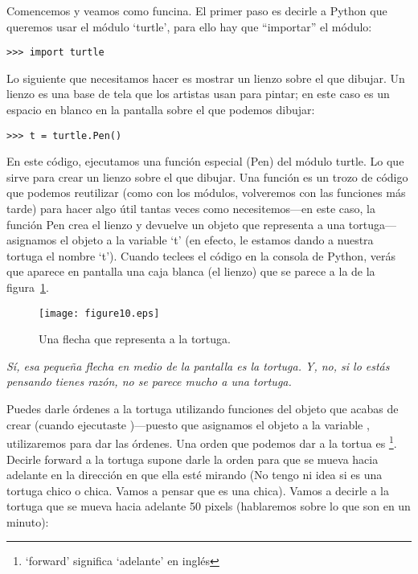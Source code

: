 Comencemos y veamos como funcina.  El primer paso es decirle a Python que queremos usar el módulo `turtle', para ello hay que ``importar'' el módulo:

\begin{listing}
\begin{verbatim}
>>> import turtle
\end{verbatim}
\end{listing}

Lo siguiente que necesitamos hacer es mostrar un lienzo sobre el que dibujar.  Un lienzo es una base de tela que los artistas usan para pintar; en este caso es un espacio en blanco en la pantalla sobre el que podemos dibujar:

\begin{listing}
\begin{verbatim}
>>> t = turtle.Pen()
\end{verbatim}
\end{listing}

En este código, ejecutamos una función especial (Pen) del módulo turtle. Lo que sirve para crear un lienzo sobre el que dibujar. Una función es un trozo de código que podemos reutilizar (como con los módulos, volveremos con las funciones más tarde) para hacer algo útil tantas veces como necesitemos---en este caso, la función Pen crea el lienzo y devuelve un objeto que representa a una tortuga---asignamos el objeto a la variable `t' (en efecto, le estamos dando a nuestra tortuga el nombre `t'). Cuando teclees el código en la consola de Python, verás que aparece en pantalla una caja blanca (el lienzo) que se parece a la de la figura~\ref{fig10}.

\begin{figure}
\begin{center}
\texttt{[image: figure10.eps]}
\end{center}
\caption{Una flecha que representa a la tortuga.}\label{fig10}
\end{figure}

\emph{Sí, esa pequeña flecha en medio de la pantalla es la tortuga. Y, no, si lo estás pensando tienes razón, no se parece mucho a una tortuga.}

Puedes darle órdenes a la tortuga utilizando funciones del objeto que acabas de crear (cuando ejecutaste )---puesto que asignamos el objeto a la variable , utilizaremos  para dar las órdenes.
Una orden que podemos dar a la tortua es \footnote{`forward' significa `adelante' en inglés}.  Decirle forward a la tortuga supone darle la orden para que se mueva hacia adelante en la dirección en que ella esté mirando (No tengo ni idea si es una tortuga chico o chica. Vamos a pensar que es una chica). Vamos a decirle a la tortuga que se mueva hacia adelante 50 pixels (hablaremos sobre lo que son en un minuto):

